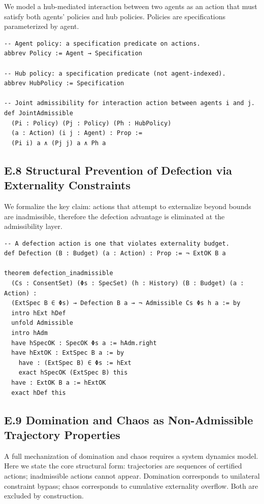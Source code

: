 \documentclass[11pt,oneside]{article}
\begin{document}
We model a hub-mediated interaction between two agents as an action that must satisfy both agents’ policies and hub policies. Policies are specifications parameterized by agent.

\begin{verbatim}
-- Agent policy: a specification predicate on actions.
abbrev Policy := Agent → Specification

-- Hub policy: a specification predicate (not agent-indexed).
abbrev HubPolicy := Specification

-- Joint admissibility for interaction action between agents i and j.
def JointAdmissible
  (Pi : Policy) (Pj : Policy) (Ph : HubPolicy)
  (a : Action) (i j : Agent) : Prop :=
  (Pi i) a ∧ (Pj j) a ∧ Ph a
\end{verbatim}

\subsection{E.8 Structural Prevention of Defection via Externality Constraints}

We formalize the key claim: actions that attempt to externalize beyond bounds are inadmissible, therefore the defection advantage is eliminated at the admissibility layer.

\begin{verbatim}
-- A defection action is one that violates externality budget.
def Defection (B : Budget) (a : Action) : Prop := ¬ ExtOK B a

theorem defection_inadmissible
  (Cs : ConsentSet) (Φs : SpecSet) (h : History) (B : Budget) (a : Action) :
  (ExtSpec B ∈ Φs) → Defection B a → ¬ Admissible Cs Φs h a := by
  intro hExt hDef
  unfold Admissible
  intro hAdm
  have hSpecOK : SpecOK Φs a := hAdm.right
  have hExtOK : ExtSpec B a := by
    have : (ExtSpec B) ∈ Φs := hExt
    exact hSpecOK (ExtSpec B) this
  have : ExtOK B a := hExtOK
  exact hDef this
\end{verbatim}

\subsection{E.9 Domination and Chaos as Non-Admissible Trajectory Properties}

A full mechanization of domination and chaos requires a system dynamics model. Here we state the core structural form: trajectories are sequences of certified actions; inadmissible actions cannot appear. Domination corresponds to unilateral constraint bypass; chaos corresponds to cumulative externality overflow. Both are excluded by construction.
\end{document}
